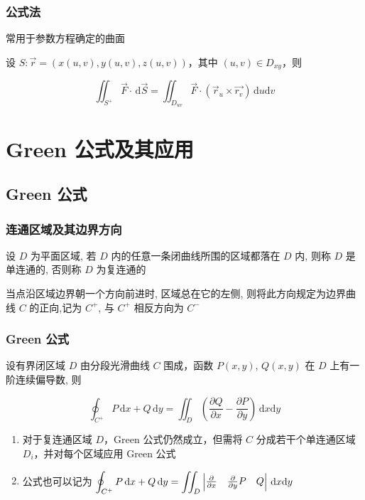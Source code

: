 \documentclass[lang = zh , final , oneside , openany , titlepage , zihao = -4 , linespread = 1.3 , baselineskip = false , cjk-font = windows , text-font = newtx , math-font = newtx , math-style = TeX]{sjtureport}
\begin{document}
\subsubsection{公式法}

常用于参数方程确定的曲面

设 \(S:\vec{r} = \left(x(u,v),y(u,v),z(u,v)\right)\)，其中
\((u,v)\in D_{xy}\)，则

\[\iint_{S^+}\vec{F}\cdot\,\mathrm{d}\vec{S} = \iint_{D_{uv}}\vec{F}\cdot\left(\vec{r}_u\times\vec{r_v}\right)\,\mathrm{d}u\mathrm{d}v\]

\section{Green 公式及其应用}

\subsection{Green 公式}

\subsubsection{连通区域及其边界方向}

设 \(D\) 为平面区域, 若 \(D\) 内的任意一条闭曲线所围的区域都落在 \(D\)
内, 则称 \(D\) 是单连通的, 否则称 \(D\) 为复连通的

当点沿区域边界朝一个方向前进时, 区域总在它的左侧,
则将此方向规定为边界曲线 \(C\) 的正向,记为 \(C^+\), 与 \(C^+\)
相反方向为 \(C^-\)

\subsubsection{Green 公式}

\begin{theorem}
    设有界闭区域 \(D\) 由分段光滑曲线 \(C\) 围成，函数 \(P(x, y)\),
\(Q(x, y)\) 在 \(D\) 上有一阶连续偏导数, 则

\[\oint_{C^+} P\,\mathrm{d}x + Q\,\mathrm{d}y = \iint_D \left(\frac{\partial Q}{\partial x} - \frac{\partial P}{\partial y}\right)\,\mathrm{d}x\mathrm{d}y\]
\end{theorem}

\begin{enumerate}
\item
  对于复连通区域 \(D\)，Green 公式仍然成立，但需将 \(C\)
  分成若干个单连通区域 \(D_i\)，并对每个区域应用 Green 公式
\item
  公式也可以记为
  \(\displaystyle\oint_{C^+} P\,\mathrm{d}x + Q\,\mathrm{d}y = \iint_D \begin{vmatrix}\frac{\partial}{\partial x}&\frac{\partial}{\partial y}\newline P&Q\end{vmatrix}\,\mathrm{d}x\mathrm{d}y\)
\end{enumerate}
\end{document}

